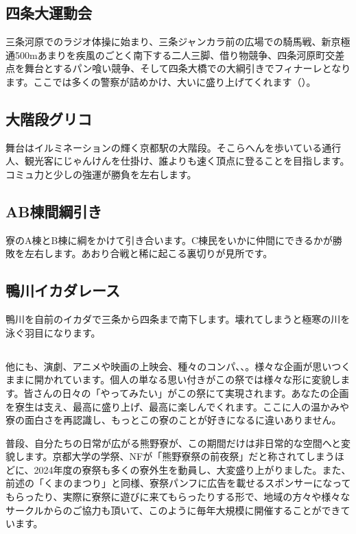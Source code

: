 \subsection{四条大運動会}

三条河原でのラジオ体操に始まり、三条ジャンカラ前の広場での騎馬戦、新京極通500mあまりを疾風のごとく南下する二人三脚、借り物競争、四条河原町交差点を舞台とするパン喰い競争、そして四条大橋での大綱引きでフィナーレとなります。ここでは多くの警察が詰めかけ、大いに盛り上げてくれます（）。



\subsection{大階段グリコ}

舞台はイルミネーションの輝く京都駅の大階段。そこらへんを歩いている通行人、観光客にじゃんけんを仕掛け、誰よりも速く頂点に登ることを目指します。コミュ力と少しの強運が勝負を左右します。

\subsection{AB棟間綱引き}

寮のA棟とB棟に綱をかけて引き合います。C棟民をいかに仲間にできるかが勝敗を左右します。あおり合戦と稀に起こる裏切りが見所です。

\subsection{鴨川イカダレース}

鴨川を自前のイカダで三条から四条まで南下します。壊れてしまうと極寒の川を泳ぐ羽目になります。


\subsection{}

他にも、演劇、アニメや映画の上映会、種々のコンパ、、。様々な企画が思いつくままに開かれています。個人の単なる思い付きがこの祭では様々な形に変貌します。皆さんの日々の「やってみたい」がこの祭にて実現されます。あなたの企画を寮生は支え、最高に盛り上げ、最高に楽しんでくれます。ここに人の温かみや寮の面白さを再認識し、もっとこの寮のことが好きになるに違いありません。

普段、自分たちの日常が広がる熊野寮が、この期間だけは非日常的な空間へと変貌します。京都大学の学祭、NFが「熊野寮祭の前夜祭」だと称されてしまうほどに、2024年度の寮祭も多くの寮外生を動員し、大変盛り上がりました。また、前述の「くまのまつり」と同様、寮祭パンフに広告を載せるスポンサーになってもらったり、実際に寮祭に遊びに来てもらったりする形で、地域の方々や様々なサークルからのご協力も頂いて、このように毎年大規模に開催することができています。

